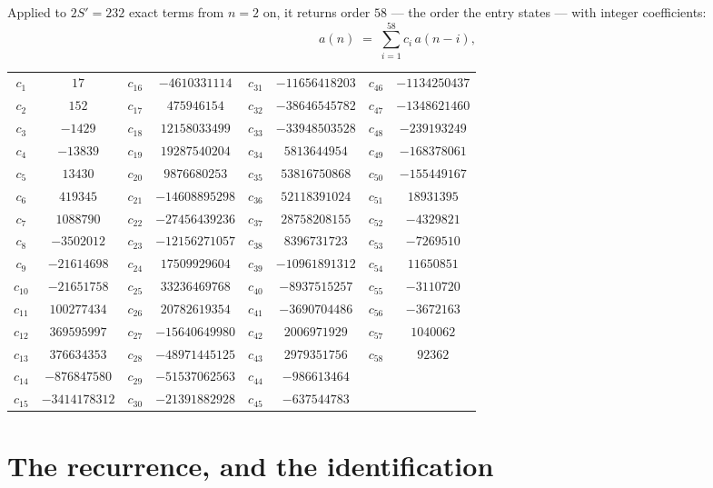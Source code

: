 \documentclass[11pt,a4paper]{article}
\theoremstyle{plain}
\theoremstyle{definition}
\begin{document}
Applied to $2S'=232$ exact terms from $n=2$ on, it returns order $58$ --- the
order the entry states --- with integer coefficients:
\[
a(n)\;=\;\sum_{i=1}^{58}c_i\,a(n-i),
\]
\begin{center}\small
\begin{tabular}{cccccccc}
$c_{1}$ & $17$ & $c_{16}$ & $-4610331114$ & $c_{31}$ & $-11656418203$ & $c_{46}$ & $-1134250437$ \\
$c_{2}$ & $152$ & $c_{17}$ & $475946154$ & $c_{32}$ & $-38646545782$ & $c_{47}$ & $-1348621460$ \\
$c_{3}$ & $-1429$ & $c_{18}$ & $12158033499$ & $c_{33}$ & $-33948503528$ & $c_{48}$ & $-239193249$ \\
$c_{4}$ & $-13839$ & $c_{19}$ & $19287540204$ & $c_{34}$ & $5813644954$ & $c_{49}$ & $-168378061$ \\
$c_{5}$ & $13430$ & $c_{20}$ & $9876680253$ & $c_{35}$ & $53816750868$ & $c_{50}$ & $-155449167$ \\
$c_{6}$ & $419345$ & $c_{21}$ & $-14608895298$ & $c_{36}$ & $52118391024$ & $c_{51}$ & $18931395$ \\
$c_{7}$ & $1088790$ & $c_{22}$ & $-27456439236$ & $c_{37}$ & $28758208155$ & $c_{52}$ & $-4329821$ \\
$c_{8}$ & $-3502012$ & $c_{23}$ & $-12156271057$ & $c_{38}$ & $8396731723$ & $c_{53}$ & $-7269510$ \\
$c_{9}$ & $-21614698$ & $c_{24}$ & $17509929604$ & $c_{39}$ & $-10961891312$ & $c_{54}$ & $11650851$ \\
$c_{10}$ & $-21651758$ & $c_{25}$ & $33236469768$ & $c_{40}$ & $-8937515257$ & $c_{55}$ & $-3110720$ \\
$c_{11}$ & $100277434$ & $c_{26}$ & $20782619354$ & $c_{41}$ & $-3690704486$ & $c_{56}$ & $-3672163$ \\
$c_{12}$ & $369595997$ & $c_{27}$ & $-15640649980$ & $c_{42}$ & $2006971929$ & $c_{57}$ & $1040062$ \\
$c_{13}$ & $376634353$ & $c_{28}$ & $-48971445125$ & $c_{43}$ & $2979351756$ & $c_{58}$ & $92362$ \\
$c_{14}$ & $-876847580$ & $c_{29}$ & $-51537062563$ & $c_{44}$ & $-986613464$ &  &  \\
$c_{15}$ & $-3414178312$ & $c_{30}$ & $-21391882928$ & $c_{45}$ & $-637544783$ &  &  \\
\end{tabular}
\end{center}

\section{The recurrence, and the identification}
\end{document}
